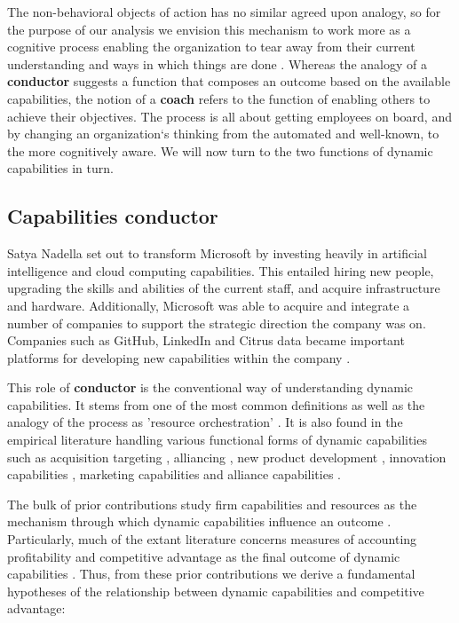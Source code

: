 \documentclass[review,fleqn]{elsarticle}\usepackage[]{graphicx}\usepackage[]{color}
\begin{document}
The non-behavioral objects of action has no similar agreed upon analogy, so for the
purpose of our analysis we envision this mechanism to work more as a cognitive process
enabling the organization to tear away from their current understanding and ways in which
things are done \citep{Vince2011}. Whereas the analogy of a {\bf conductor} suggests a
function that composes an outcome based on the available capabilities, the notion of a
{\bf coach} refers to the function of enabling others to achieve their objectives. The
process is all about getting employees on board, and by changing an organization`s
thinking from the automated and well-known, to the more cognitively aware. We will now
turn to the two functions of dynamic capabilities in turn.


\subsection*{Capabilities conductor}

Satya Nadella set out to transform Microsoft by investing heavily in artificial
intelligence and cloud computing capabilities. This entailed hiring new people, upgrading
the skills and abilities of the current staff, and acquire infrastructure and
hardware. Additionally, Microsoft was able to acquire and integrate a number of companies
to support the strategic direction the company was on. Companies such as GitHub, LinkedIn
and Citrus data became important platforms for developing new capabilities within the
company \cite{Nadella2017}.

This role of {\bf conductor} is the conventional way of understanding dynamic capabilities. It
stems from one of the most common definitions \citep{Helfat2007} as well as the analogy of
the process as 'resource orchestration' \citep{Sirmon2011}. It is also found in the
empirical literature handling various functional forms of dynamic capabilities such as
acquisition targeting \citep{Bingham2015}, alliancing \citep{Schilke2014}, new product
development \citep{Danneels2008}, innovation capabilities \citep{Breznik2014}, marketing
capabilities \citep{Brune2009} and alliance capabilities \citep{Kale2002,kale2007}.

The bulk of prior contributions study firm capabilities and resources as the mechanism
through which dynamic capabilities influence an outcome
\citep{Pezeshkan2016b,Fainshmidt2016a,Protogerou2012,Schilke2018}. Particularly, much of
the extant literature concerns measures of accounting profitability and competitive
advantage as the final outcome of dynamic capabilities
\cite{shamsie2009,Schilke2014,Schilke2014a,Teece2016}. Thus, from these prior
contributions we derive a fundamental hypotheses of the relationship between dynamic
capabilities and competitive advantage:
\end{document}
